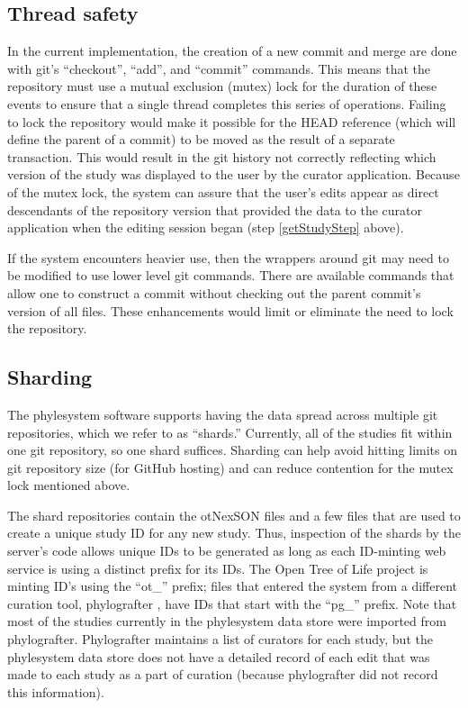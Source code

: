 \documentclass{bioinfo}
\newcommand{\ps}{phylesystem\xspace}
\newcommand{\otol}{Open Tree of Life\xspace}
\newcommand{\nexson}{otNexSON\xspace}
\begin{document}
\begin{methods}
\subsection*{Thread safety}
In the current implementation, the creation of a new commit and merge are done with git's ``checkout'', ``add'', and ``commit'' commands.
This means that the repository must use a mutual exclusion (mutex) lock for the duration of these events
    to ensure that a single thread completes this series of operations.
Failing to lock the repository would make it possible for the HEAD reference (which
    will define the parent of a commit) to be moved as the result of a separate transaction.
This would result in the git history not correctly reflecting which version of the 
    study was displayed to the user by the curator application.
Because of the mutex lock, the system can assure that the user's edits appear
    as direct descendants of the repository version that provided the data to 
    the curator application when the editing session began (step \ref{getStudyStep} above).

If the system encounters heavier use, then the wrappers around git may need to 
    be modified to use lower level git commands.
There are available commands that allow one to construct a commit without checking out
    the parent commit's version of all files.
These enhancements would limit or eliminate the need to lock the repository.
\subsection*{Sharding}
The \ps software supports having the data spread across multiple git repositories, which
    we refer to as ``shards.''
Currently, all of the studies fit within one git repository, so one shard suffices.
Sharding can help avoid hitting limits on git repository size (for GitHub hosting) and can 
    reduce contention for the mutex lock mentioned above.

The shard repositories contain the \nexson files and a few files that are used to 
    create a unique study ID for any new study.
Thus, inspection of the shards by the server's code allows unique IDs to be generated as long as 
    each ID-minting web service is using a distinct prefix for its IDs.
The \otol project is minting ID's using the ``ot\_'' prefix;
    files that entered the system from a different curation tool, phylografter \citep{Phylografter},
    have IDs that start with the ``pg\_'' prefix. 
Note that most of the studies currently in the \ps data store were imported from phylografter.
Phylografter maintains a list of curators for each study, but the \ps data store does not
    have a detailed record of each edit that was made to each study as a part of 
    curation (because phylografter did not record this information).


\end{methods}
\end{document}
